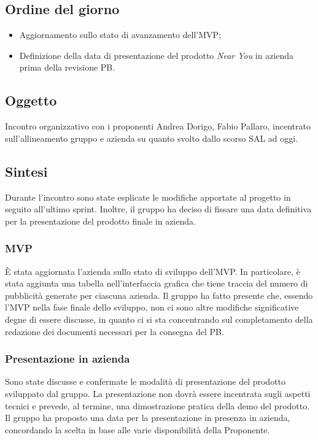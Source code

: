 \documentclass[10pt]{article}
\begin{document}
\subsection{Ordine del giorno}
\begin{itemize}
    \item Aggiornamento sullo stato di avanzamento dell’MVP;
    \item Definizione della data di presentazione del prodotto \textit{Near You} in azienda prima della revisione PB.
\end{itemize}

\subsection{Oggetto}
Incontro organizzativo con i proponenti Andrea Dorigo, Fabio Pallaro, incentrato sull'allineamento gruppo e azienda su quanto svolto dallo scorso SAL ad oggi.

\subsection{Sintesi}
Durante l'incontro sono state esplicate le modifiche apportate al progetto in seguito all'ultimo sprint. Inoltre, il gruppo ha deciso di fissare una data definitiva per la presentazione del prodotto finale in azienda.

    
    \subsubsection{MVP}
    È stata aggiornata l'azienda sullo stato di sviluppo dell'MVP. In particolare, è stata aggiunta una tabella nell'interfaccia grafica che tiene traccia del numero di pubblicità generate per ciascuna azienda. Il gruppo ha fatto presente che, essendo l'MVP nella fase finale dello sviluppo, non ci sono altre modifiche significative degne di essere discusse, in quanto ci si sta concentrando sul completamento della redazione dei documenti necessari per la consegna del PB.

    \subsubsection{Presentazione in azienda}
    Sono state discusse e confermate le modalità di presentazione del prodotto sviluppato dal gruppo. La presentazione non dovrà essere incentrata sugli aspetti tecnici e prevede, al termine, una dimostrazione pratica della demo del prodotto. Il gruppo ha proposto una data per la presentazione in presenza in azienda, concordando la scelta in base alle varie disponibilità della Proponente.
\end{document}
